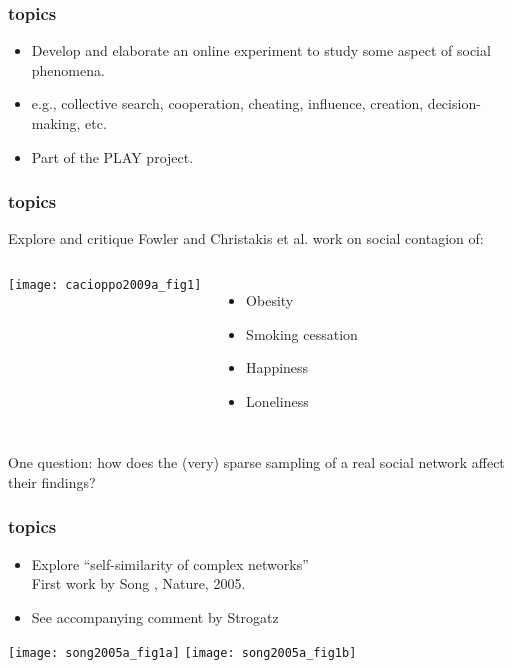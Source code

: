 \begin{frame}
  \frametitle{topics}

  \begin{itemize}
  \item<1->    
    Develop and elaborate an \alert{online experiment}
    to study some aspect of \alert{social phenomena}.
  \item<2-> e.g., 
    collective search, 
    cooperation, 
    cheating, 
    influence, 
    creation,
    decision-making, 
    etc.
  \item<3-> Part of the PLAY project.
  \end{itemize}

\end{frame}

\begin{frame}
  \frametitle{topics}

  \begin{block}{Explore and critique Fowler and Christakis et al. work on
    social contagion of:}
  \begin{columns}
    \texttt{[image: cacioppo2009a\_fig1]}
  \begin{itemize}
  \item 
    Obesity\cite{christakis2007a}
  \item
    Smoking cessation\cite{christakis2008a}
  \item
    Happiness\cite{fowler2008a}
  \item
    Loneliness\cite{cacioppo2009a}
  \end{itemize}
  \end{columns}
  \end{block}
  
  One question: how does the (very) sparse sampling
  of a real social network affect their findings?

\end{frame}

\begin{frame}
  \frametitle{topics}

  \begin{itemize}
  \item<1->    
    Explore ``self-similarity of complex networks''\cite{song2005a,song2006a}\\
    First work by Song \etal, Nature, 2005.
  \item<1->
    See accompanying comment by Strogatz\cite{strogatz2005a}
  \end{itemize}
    \texttt{[image: song2005a\_fig1a]}
    \texttt{[image: song2005a\_fig1b]}

\end{frame}

